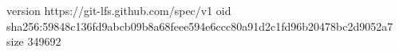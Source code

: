 version https://git-lfs.github.com/spec/v1
oid sha256:59848c136fd9abcb09b8a68feee594e6ccc80a91d2c1fd96b20478bc2d9052a7
size 349692
